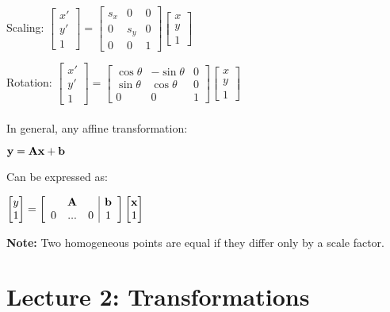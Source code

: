 \documentclass{article}\author{Hawley, Adam}
\begin{document}
Scaling: $\begin{bmatrix}x'\\y'\\1\end{bmatrix}
= \begin{bmatrix}s_x&0&0\\0&s_y&0\\0&0&1\end{bmatrix}
\begin{bmatrix}x\\y\\1\end{bmatrix}$

Rotation: $\begin{bmatrix}x'\\y'\\1\end{bmatrix}
=\begin{bmatrix}\cos\theta&-\sin\theta&0\\
		\sin\theta&\cos\theta&0\\
		0&0&1\end{bmatrix}
\begin{bmatrix} x\\y\\1	\end{bmatrix}$\\
\vspace{2.5mm}
\vspace{2.5mm}
\\
In general, any affine transformation:

\centerline{$\bf y = Ax + b$}

Can be expressed as:

\centerline{$ \begin{bmatrix}y\\1\end{bmatrix}=
	 \left[ \begin{array}{ccc|c}
	 &{\bf A}&& {\bf b} \\ 0&...&0&1
	\end{array} \right] 
	\begin{bmatrix}
	{\bf x}\\1
	\end{bmatrix}
$}

{\bf Note:} Two homogeneous points are equal if they differ only by a scale factor.
\maketitle
\section{Lecture 2: Transformations}
\newpage
\end{document}
